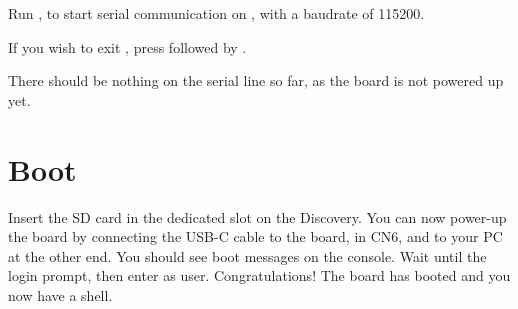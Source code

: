 Run , to start serial
communication on , with a baudrate of 115200.

If you wish to exit , press \code{[Ctrl][a]} followed by
\code{[Ctrl][x]}.

There should be nothing on the serial line so far, as the board is not
powered up yet.

\section{Boot}

Insert the SD card in the dedicated slot on the Discovery.  You can
now power-up the board by connecting the USB-C cable to the board, in
CN6,  and to your PC at the other end.  You should see
boot messages on the console. Wait until the login prompt, then enter
 as user.  Congratulations! The board has booted and you
now have a shell.


